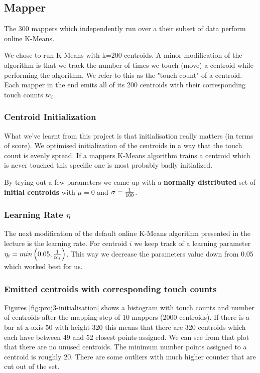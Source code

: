 \documentclass[a4paper, 11pt]{article}
\begin{document}
\subsection{Mapper}
The 300 mappers which independently run over a their subset of data perform online K-Means.

We chose to run K-Means with k=200 centroids. A minor modification of the algorithm is that we track the number of times we touch (move) a centroid while performing the algorithm. We refer to this as the "touch count" of a centroid. Each mapper in the end emits all of its 200 centroids with their corresponding touch counts $tc_i$.

\subsubsection{Centroid Initialization}
What we've learnt from this project is that initialisation really matters (in terms of score). We optimised initialization of the centroids in a way that the touch count is evenly spread. If a mappers K-Means algorithm trains a centroid which is never touched this specific one is most probably badly initialized.

By trying out a few parameters we came up with a \textbf{normally distributed} set of \textbf{initial centroids} with $\mu = 0$ and $\sigma = {1 \over 100}$.

\subsubsection{Learning Rate $\eta$}
The next modification of the default online K-Means algorithm presented in the lecture is the learning rate. For centroid $i$ we keep track of a learning parameter $\eta_i = min \left(0.05, {1\over tc_i} \right)$. This way we decrease the parameters value down from 0.05 which worked best for us.

\subsubsection{Emitted centroids with corresponding touch counts}
Figures \ref{fig:proj3-initialisation} shows a histogram with touch counts and number of centroids after the mapping step of 10 mappers (2000 centroids). If there is a bar at x-axis 50 with height 320 this means that there are 320 centroids which each have between 49 and 52 closest points assigned. We can see from that plot that there are no unused centroids. The minimum number points assigned to a centroid is roughly 20. There are some outliers with much higher counter that are cut out of the set.
\end{document}
